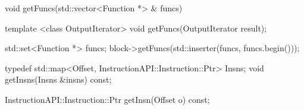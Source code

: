\begin{apient}
void getFuncs(std::vector<Function *> & funcs)
\end{apient}

\begin{apient}
template <class OutputIterator>
void getFuncs(OutputIterator result);
\end{apient}

\begin{apient}
std::set<Function *> funcs;
block->getFuncs(std::inserter(funcs, funcs.begin()));
\end{apient}

\begin{apient}
typedef std::map<Offset, InstructionAPI::Instruction::Ptr> Insns;
void getInsns(Insns &insns) const;
\end{apient}

\begin{apient}
InstructionAPI::Instruction::Ptr getInsn(Offset o) const;
\end{apient}
